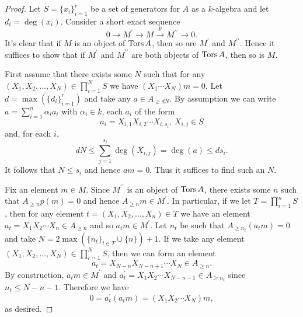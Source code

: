 \begin{proof}
  Let \(S = \{x_i\}_{i=1}^r\) be a set of generators for \(A\) as a \(k\)-algebra and let \(d_i = \deg(x_i)\).
  Consider a short exact sequence
  \[0 \to M^\prime \to M \overset{p}\to M^{\prime\prime} \to 0.\]
  It's clear that if \(M\) is an object of \(\operatorname{Tors}A\), then so are \(M^\prime\) and \(M^{\prime\prime}\).
  Hence it suffices to show that if \(M^\prime\) and \(M^{\prime\prime}\) are both objects of \(\operatorname{Tors}A\), then so is \(M\).
  
  First assume that there exists some \(N\) such that for any \((X_1, X_2, \ldots, X_N) \in \prod_{i = 1}^N S\) we have \((X_1 \cdots X_N)m = 0\).
  Let \(d = \max(\{d_i\}_{i = 1}^r)\) and take any \(a \in A_{\geq dN}\).
  By assumption we can write \(a = \sum_{i=1}^n \alpha_i a_i\) with \(\alpha_i \in k\), each \(a_i\) of the form
  \[a_i = X_{i,1} X_{i,2}\cdots X_{i, s_i},\, X_{i,j} \in S\]
  and, for each \(i\),
  \[dN \leq \sum_{j = 1}^{s_i} \deg(X_{i,j}) = \deg(a) \leq ds_i.\]
  It follows that \(N \leq s_i\) and hence \(am = 0\).
  Thus it suffices to find such an \(N\).

  Fix an element \(m \in M\).
  Since \(M^{\prime\prime}\) is an object of \(\operatorname{Tors}A\), there exists some \(n\) such that \(A_{\geq n} p(m) = 0\) and hence \(A_{\geq n}m \in M^\prime\).
  In particular, if we let \(T = \prod_{i = 1}^n S\), then for any element \(t = (X_1, X_2, \ldots, X_n) \in T\) we have an element \(a_t = X_1 X_2 \cdots X_n \in A_{\geq n}\) and so \(a_t m \in M^\prime\).
  Let \(n_t\) be such that \(A_{\geq n_t} (a_t m) = 0\) and take \(N = 2\max(\{n_t\}_{t \in T} \cup \{n\}) + 1\).
  If we take any element \((X_1, X_2, \ldots, X_N) \in \prod_{i = 1}^N S\), then we can form an element
     \[a_t = X_{N - n} X_{N - n + 1} \cdots X_N \in A_{\geq n}.\]
  By construction, \(a_t m \in M^\prime\) and \(a_t^\prime = X_1 X_2 \cdots X_{N - n - 1} \in A_{\geq n_t}\) since \(n_t \leq N - n - 1\).
  Therefore we have
  \[0 = a_t^\prime (a_t m) = (X_1 X_2 \cdots X_N) m,\]
  as desired.
\end{proof}

